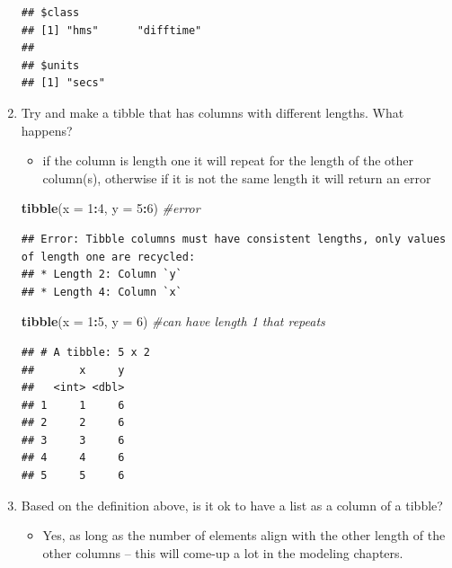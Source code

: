 \documentclass[]{book}
\newenvironment{Shaded}{\begin{snugshade}}{\end{snugshade}}
\newcommand{\CommentTok}[1]{\textcolor[rgb]{0.56,0.35,0.01}{\textit{#1}}}
\newcommand{\DataTypeTok}[1]{\textcolor[rgb]{0.13,0.29,0.53}{#1}}
\newcommand{\DecValTok}[1]{\textcolor[rgb]{0.00,0.00,0.81}{#1}}
\newcommand{\KeywordTok}[1]{\textcolor[rgb]{0.13,0.29,0.53}{\textbf{#1}}}
\newcommand{\NormalTok}[1]{#1}
\newcommand{\OperatorTok}[1]{\textcolor[rgb]{0.81,0.36,0.00}{\textbf{#1}}}
\providecommand{\tightlist}{%
  \setlength{\itemsep}{0pt}\setlength{\parskip}{0pt}}
\theoremstyle{definition}
\theoremstyle{definition}
\theoremstyle{definition}
\theoremstyle{remark}
\begin{document}
\begin{enumerate}
\begin{verbatim}
## $class
## [1] "hms"      "difftime"
## 
## $units
## [1] "secs"
\end{verbatim}
\item
  Try and make a tibble that has columns with different lengths. What
  happens?

  \begin{itemize}
  \tightlist
  \item
    if the column is length one it will repeat for the length of the
    other column(s), otherwise if it is not the same length it will
    return an error
  \end{itemize}

\begin{Shaded}
\begin{Highlighting}[]
\KeywordTok{tibble}\NormalTok{(}\DataTypeTok{x =} \DecValTok{1}\OperatorTok{:}\DecValTok{4}\NormalTok{, }\DataTypeTok{y =} \DecValTok{5}\OperatorTok{:}\DecValTok{6}\NormalTok{)  }\CommentTok{#error}
\end{Highlighting}
\end{Shaded}

\begin{verbatim}
## Error: Tibble columns must have consistent lengths, only values of length one are recycled:
## * Length 2: Column `y`
## * Length 4: Column `x`
\end{verbatim}

\begin{Shaded}
\begin{Highlighting}[]
\KeywordTok{tibble}\NormalTok{(}\DataTypeTok{x =} \DecValTok{1}\OperatorTok{:}\DecValTok{5}\NormalTok{, }\DataTypeTok{y =} \DecValTok{6}\NormalTok{)  }\CommentTok{#can have length 1 that repeats}
\end{Highlighting}
\end{Shaded}

\begin{verbatim}
## # A tibble: 5 x 2
##       x     y
##   <int> <dbl>
## 1     1     6
## 2     2     6
## 3     3     6
## 4     4     6
## 5     5     6
\end{verbatim}
\item
  Based on the definition above, is it ok to have a list as a column of
  a tibble?

  \begin{itemize}
  \tightlist
  \item
    Yes, as long as the number of elements align with the other length
    of the other columns -- this will come-up a lot in the modeling
    chapters.
  \end{itemize}
\end{enumerate}
\end{document}
